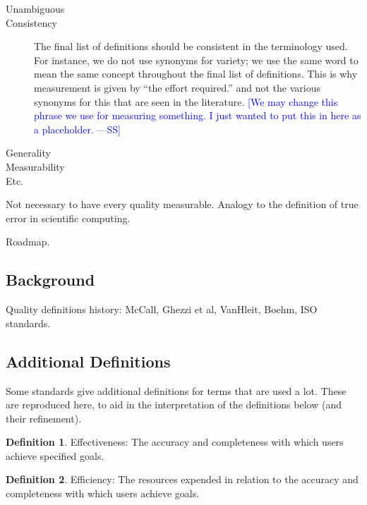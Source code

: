 \documentclass[letterpaper, cleveref]{lipics-v2019}
\newcommand{\authornote}[3]{\textcolor{#1}{[#3 ---#2]}}
\newcommand{\authornote}[3]{}
\newcommand{\wss}[1]{\authornote{blue}{SS}{#1}} %
\theoremstyle{definition}
\newtheorem{defn}{Definition}
\begin{document}
\begin{description}

  \item[Unambiguous]

  \item[Consistency] The final list of definitions should be consistent in
  the terminology used.  For instance, we do not use synonyms for variety;
  we use the same word to mean the same concept throughout the final list of
  definitions.  This is why measurement is given by ``the effort required.''
  and not the various synonyms for this that are seen in the literature.
  \wss{We may change this phrase we use for measuring something.  I just
  wanted to put this in here as a placeholder.}

  \item[Generality]

  \item[Measurability]

  \item[Etc.]

\end{description}

Not necessary to have every quality measurable.  Analogy to the definition of
true error in scientific computing.

Roadmap.
\subsection{Background}

Quality definitions history: McCall, Ghezzi et al, VanHleit, Boehm, ISO standards.

\subsection{Additional Definitions}

Some standards give additional definitions for terms that are used a lot.
These are reproduced here, to aid in the interpretation of the definitions
below (and their refinement).

\begin{defn} 
\textsf{Effectiveness}:
The accuracy and completeness with which users achieve specified
goals. \cite{ISO9241:11}
\end{defn}

\begin{defn} 
\textsf{Efficiency}: 
The resources expended in relation to the accuracy and
completeness with which users achieve goals. \cite{ISO9241:11}
\end{defn}
\end{document}
